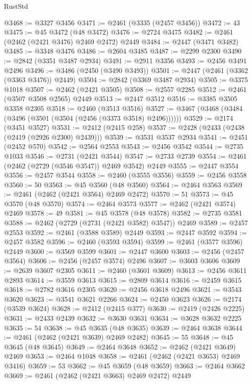 \begin{lexlean}{RustStd}
\begin{coremodule}
@3468 := @3327 @3456
@3471 := @2461 (@3335 (@2457 @3456))
@3472 := 43
@3475 := @45 @3472 (@48 @3472)
@3476 := @2724 @3475
@3482 := @2461 (@2462 (@2421 @3476) @2469 @2472) @2449
@3484 := @2447 (@3471 @3482)
@3485 := @3348 @3476
@3486 := @2604 @3485
@3487 := @2299 @2300
@3490 := @2842 (@3351 @3487 @2934)
@3491 := @2911 @3356
@3493 := @2456 @3491 @2496
@3496 := @3486 (@2450 (@3490 @3493))
@3501 := @2447 (@2461 (@3362 (@3363 @3476)) @2449)
@3504 := @2842 (@3369 @3487 @2934)
@3505 := @3375 @1018
@3507 := @2462 (@2421 @3505)
@3508 := @2557 @2285
@3512 := @2461 (@3507 @3508 @2565) @2449
@3513 := @2447 @3512
@3516 := @3385 @3505 @3358 @2305
@3518 := @2460 (@3513 @3516)
@3527 := @3467 (@3468 (@3484 (@3496 (@3501 (@3504 (@2456 (@3373 @3518) @2496))))))
@3529 := @2174 (@3451 @3527)
@3531 := @2412 (@2415 @258)
@3537 := @2428 (@2433 (@2438 (@2419 (@2926 @2300) @2439)))
@3539 := @3531 @3537 @2934
@3541 := @2451 (@2452 @570)
@3542 := @2564 @2553
@3543 := @2456 @3542
@3544 := @2735 @1033
@3546 := @2731 (@2421 @3544)
@3547 := @2733 @2739
@3554 := @2461 (@2462 (@2729 (@3546 @3547)) @2469 @3542) @2449
@3555 := @2447 @3554
@3556 := @2457 @3544
@3558 := @2460 (@3555 @3556)
@3559 := @2456 @3558
@3560 := 50
@3563 := @45 @3560 (@48 @3560)
@3564 := @2464 @3563
@3569 := @2461 (@2462 (@2421 @3564) @2469 @2472)
@3570 := 51
@3573 := @45 @3570 (@48 @3570)
@3574 := @2464 @3573
@3577 := @2462 (@2421 @3574) @2469
@3578 := 49
@3581 := @45 @3578 (@48 @3578)
@3582 := @2735 @3581
@3588 := @2462 (@2729 (@2731 (@2421 @3582) @3547)) @2469
@3589 := @2457 @2553
@3592 := @2461 (@3588 @3589) @2449
@3593 := @2447 @3592
@3594 := @2457 @3582
@3596 := @2460 (@3593 @3594)
@3599 := @2461 (@3577 @3596) @2449
@3600 := @3569 @3599
@3601 := @2447 @3600
@3603 := @2456 (@2457 @3564)
@3606 := @2456 (@2457 @3574) @2496
@3607 := @3603 @3606
@3609 := @2639 @3607 @2305
@3611 := @2460 (@3601 @3609)
@3613 := @2456 @3611 @2893
@3614 := @3559 @3613
@3615 := @2809 @3614
@3616 := @2459 @3615
@3618 := @2782 @3616 @2305
@3620 := @2456 @3618 @2496
@3621 := @3543 @3620
@3623 := @3541 @3621 @2266
@3624 := @2450 @3623
@3626 := @2174 (@3539 @3624)
@3628 := @2412 (@2415 @377)
@3630 := @2419 (@2426 @2225)
@3631 := @2433 @2439
@3632 := @3630 @3631
@3634 := @3628 @3632 @2225
@3635 := 54
@3638 := @45 @3635 (@48 @3635)
@3639 := @2464 @3638
@3644 := @2461 (@2462 (@2421 @3639) @2469 @2482)
@3645 := 55
@3648 := @45 @3645 (@48 @3645)
@3649 := @2464 @3648
@3652 := @2462 (@2421 @3649) @2469
@3653 := @2464 @1048
@3658 := @2461 (@2462 (@2421 @3653) @2469 @3416)
@3659 := 53
@3662 := @45 @3659 (@48 @3659)
@3663 := @2464 @3662
@3669 := @2461 (@2462 (@2421 @3663) @2469 @2472) @2449

\end{coremodule}
\end{lexlean}
